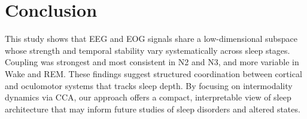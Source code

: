 \section{Conclusion}
This study shows that EEG and EOG signals share a low-dimensional subspace whose strength and temporal stability vary systematically across sleep stages. Coupling was strongest and most consistent in N2 and N3, and more variable in Wake and REM. These findings suggest structured coordination between cortical and oculomotor systems that tracks sleep depth. By focusing on intermodality dynamics via CCA, our approach offers a compact, interpretable view of sleep architecture that may inform future studies of sleep disorders and altered states.

\renewcommand{\baselinestretch}{1.5}
\cleardoublepage    %



